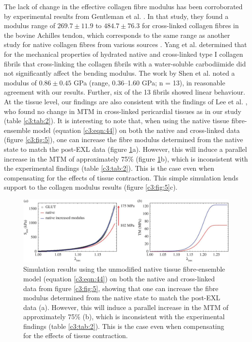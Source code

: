     
    The lack of change in the effective collagen fibre modulus has been corroborated by experimental results from Gentleman et al. \cite{gentleman_mechanical_2003}. In that study, they found a modulus range of $269.7\pm11.9$ to $ 484.7\pm76.3$ for cross-linked collagen fibres in the bovine Achilles tendon, which corresponds to the same range as another study for native collagen fibres from various sources \cite{eppell_nano_2006}. Yang et al. \cite{yang_mechanical_2008,yang_micromechanical_2007} determined that for the mechanical properties of hydrated native and cross-linked type I collagen fibrils that cross-linking the collagen fibrils with a water-soluble carbodiimide did not significantly affect the bending modulus. The work by Shen et al. \cite{shen_stress_2008} noted a modulus of $0.86\pm0.45$ GPa (range, 0.36–1.60 GPa; n = 13), in reasonable agreement with our results. Further, six of the 13 fibrils showed linear behaviour. At the tissue level, our findings are also consistent with the findings of Lee et al. \cite{lee_bovine_1989I,lee_bovine_1989II,lee_bovine_1989III}, who found no change in MTM in cross-linked pericardial tissues as in our study (table \ref{c3:tab:2}). It is interesting to note that, when using the native tissue fibre-ensemble model (equation \ref{c3:eqn:44}) on both the native and cross-linked data (figure \ref{c3:fig:5}), one can increase the fibre modulus determined from the native state to match the post-EXL data (figure \ref{c3:fig:11}a). However, this will induce a parallel increase in the MTM of approximately 75\% (figure \ref{c3:fig:11}b), which is inconsistent with the experimental findings (table \ref{c3:tab:2}). This is the case even when compensating for the effects of tissue contraction. This simple simulation lends support to the collagen modulus results (figure \ref{c3:fig:5}c).
    
    
\begin{figure}
\centering
\includegraphics[width=\textwidth]{Images/chapter3/F11large.jpg}
\caption{Simulation results using the unmodified native tissue fibre-ensemble model (equation \ref{c3:eqn:44}) on both the native and cross-linked data from figure \ref{c3:fig:5}, showing that one can increase the fibre modulus determined from the native state to match the post-EXL data (a). However, this will induce a parallel increase in the MTM of approximately 75\% 
(b), which is inconsistent with the experimental findings (table \ref{c3:tab:2}). This is the case even when compensating for the effects of tissue contraction. }
\label{c3:fig:11}
\end{figure}


